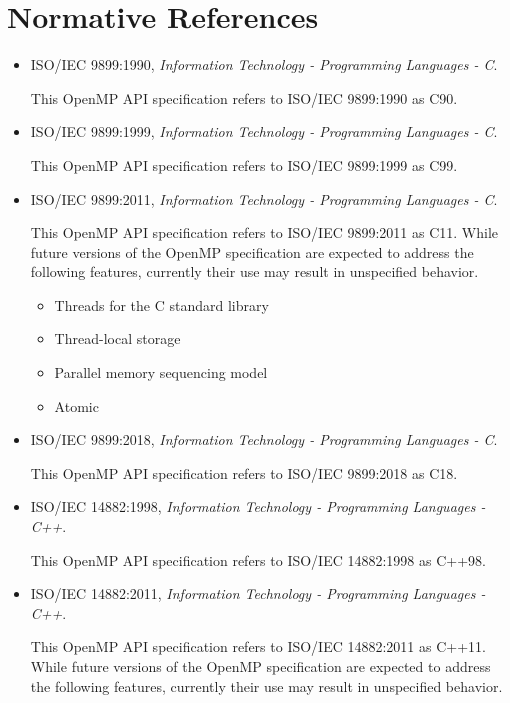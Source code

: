 \section{Normative References}
\label{sec:normative references}
\begin{itemize}
\item ISO/IEC 9899:1990, \textsl{Information Technology - Programming Languages - C}.

This OpenMP API specification refers to ISO/IEC 9899:1990 as C90.

\item ISO/IEC 9899:1999, \textsl{Information Technology - Programming Languages - C}.

This OpenMP API specification refers to ISO/IEC 9899:1999 as C99.

\item ISO/IEC 9899:2011, \textsl{Information Technology - Programming Languages - C}.

This OpenMP API specification refers to ISO/IEC 9899:2011 as C11.
While future versions of the OpenMP specification are expected to 
address the following features, currently their use may result in 
unspecified behavior.

\begin{itemize}
\item Threads for the C standard library
\item Thread-local storage
\item Parallel memory sequencing model
\item Atomic
\end{itemize}

\item ISO/IEC 9899:2018, \textsl{Information Technology - Programming Languages - C}.

This OpenMP API specification refers to ISO/IEC 9899:2018 as C18.

\item ISO/IEC 14882:1998, \textsl{Information Technology - Programming Languages - C++}.

This OpenMP API specification refers to ISO/IEC 14882:1998 as C++98.

\item ISO/IEC 14882:2011, \textsl{Information Technology - Programming Languages - C++}.

This OpenMP API specification refers to ISO/IEC 14882:2011 as C++11. 
While future versions of the OpenMP specification are expected to
address the following features, currently their use may result in
unspecified behavior.


\end{itemize}
